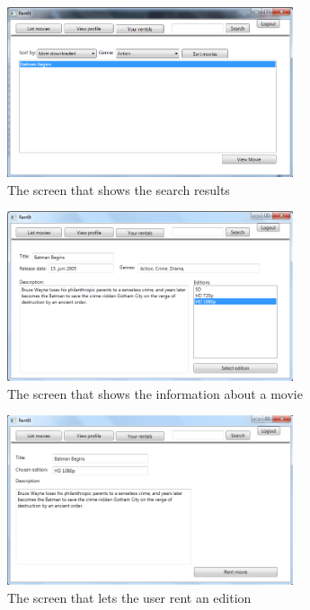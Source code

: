 \begin{figure}[h!]
  \centering
    \includegraphics[width=0.75\textwidth]{Parts/Appendix/Images/Search}
  \caption{The screen that shows the search results}
  \label{fig:Appendix_GUI_PrototypeSearch}
\end{figure}

\begin{figure}[h!]
  \centering
    \includegraphics[width=0.75\textwidth]{Parts/Appendix/Images/Viewmovie}
  \caption{The screen that shows the information about a movie}
  \label{fig:Appendix_GUI_PrototypeViewmovie}
\end{figure}

\begin{figure}[h!]
  \centering
    \includegraphics[width=0.75\textwidth]{Parts/Appendix/Images/RentEdition}
  \caption{The screen that lets the user rent an edition}
  \label{fig:Appendix_GUI_PrototypeRent}
\end{figure}




